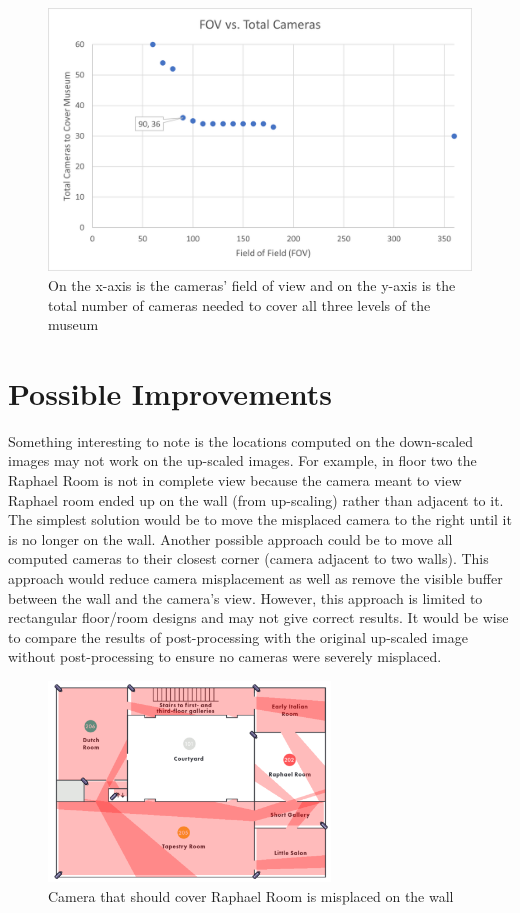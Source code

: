 \documentclass[11pt]{article}
\begin{document}
\begin{figure}[H]
	\centering
	\includegraphics{graph.png}
	\caption{\label{fig:graph} On the x-axis is the cameras' field of view and on the y-axis is the total number of cameras needed to cover all three levels of the museum}
\end{figure}

\section{Possible Improvements}
Something interesting to note is the locations computed on the down-scaled images may not work on the up-scaled images. For example, in floor two the Raphael Room is not in complete view because the camera meant to view Raphael room ended up on the wall (from up-scaling) rather than adjacent to it. The simplest solution would be to move the misplaced camera to the right until it is no longer on the wall. Another possible approach could be to move all computed cameras to their closest corner (camera adjacent to two walls). This approach would reduce camera misplacement as well as remove the visible buffer between the wall and the camera's view. However, this approach is limited to rectangular floor/room designs and may not give correct results. It would be wise to compare the results of post-processing with the original up-scaled image without post-processing to ensure no cameras were severely misplaced.
\begin{figure}[H]
	\centering
	\includegraphics[width=7.5cm]{Floor2_90.png}
	\caption{\label{fig:visited_show} Camera that should cover Raphael Room is misplaced on the wall}
\end{figure}
\end{document}
